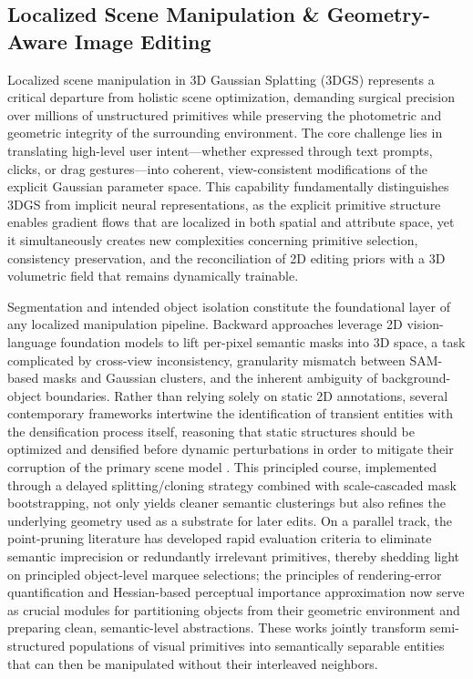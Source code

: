 \documentclass[11pt,a4paper]{article}
\begin{document}
\subsection{Localized Scene Manipulation \& Geometry-Aware Image Editing}


Localized scene manipulation in 3D Gaussian Splatting (3DGS) represents a critical departure from holistic scene optimization, demanding surgical precision over millions of unstructured primitives while preserving the photometric and geometric integrity of the surrounding environment. The core challenge lies in translating high-level user intent---whether expressed through text prompts, clicks, or drag gestures---into coherent, view-consistent modifications of the explicit Gaussian parameter space. This capability fundamentally distinguishes 3DGS from implicit neural representations, as the explicit primitive structure enables gradient flows that are localized in both spatial and attribute space, yet it simultaneously creates new complexities concerning primitive selection, consistency preservation, and the reconciliation of 2D editing priors with a 3D volumetric field that remains dynamically trainable.

Segmentation and intended object isolation constitute the foundational layer of any localized manipulation pipeline. Backward approaches leverage 2D vision-language foundation models to lift per-pixel semantic masks into 3D space, a task complicated by cross-view inconsistency, granularity mismatch between SAM-based masks and Gaussian clusters, and the inherent ambiguity of background-object boundaries. Rather than relying solely on static 2D annotations, several contemporary frameworks intertwine the identification of transient entities with the densification process itself, reasoning that static structures should be optimized and densified before dynamic perturbations in order to mitigate their corruption of the primary scene model \cite{arxiv:2506.02751v3}. This principled course, implemented through a delayed splitting/cloning strategy combined with scale-cascaded mask bootstrapping, not only yields cleaner semantic clusterings but also refines the underlying geometry used as a substrate for later edits. On a parallel track, the point-pruning literature has developed rapid evaluation criteria to eliminate semantic imprecision or redundantly irrelevant primitives, thereby shedding light on principled object-level marquee selections; the principles of rendering-error quantification \cite{arxiv:2602.06830v1} and Hessian-based perceptual importance approximation \cite{arxiv:2606.09074v3} now serve as crucial modules for partitioning objects from their geometric environment and preparing clean, semantic-level abstractions. These works jointly transform semi-structured populations of visual primitives into semantically separable entities that can then be manipulated without their interleaved neighbors.
\end{document}
